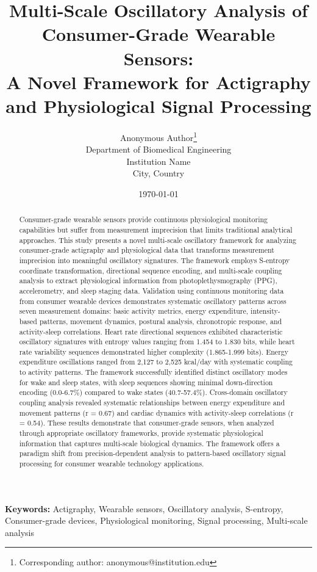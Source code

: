 \documentclass[12pt,a4paper]{article}
\title{
    \Large \textbf{Multi-Scale Oscillatory Analysis of Consumer-Grade Wearable Sensors: \\
    A Novel Framework for Actigraphy and Physiological Signal Processing}
}
\author{
    Anonymous Author\thanks{Corresponding author: anonymous@institution.edu} \\
    \small Department of Biomedical Engineering \\
    \small Institution Name \\
    \small City, Country
}
\date{\today}
\theoremstyle{definition}
\begin{document}
\maketitle

\begin{abstract}
Consumer-grade wearable sensors provide continuous physiological monitoring capabilities but suffer from measurement imprecision that limits traditional analytical approaches. This study presents a novel multi-scale oscillatory framework for analyzing consumer-grade actigraphy and physiological data that transforms measurement imprecision into meaningful oscillatory signatures. The framework employs S-entropy coordinate transformation, directional sequence encoding, and multi-scale coupling analysis to extract physiological information from photoplethysmography (PPG), accelerometry, and sleep staging data. Validation using continuous monitoring data from consumer wearable devices demonstrates systematic oscillatory patterns across seven measurement domains: basic activity metrics, energy expenditure, intensity-based patterns, movement dynamics, postural analysis, chronotropic response, and activity-sleep correlations. Heart rate directional sequences exhibited characteristic oscillatory signatures with entropy values ranging from 1.454 to 1.830 bits, while heart rate variability sequences demonstrated higher complexity (1.865-1.999 bits). Energy expenditure oscillations ranged from 2,127 to 2,525 kcal/day with systematic coupling to activity patterns. The framework successfully identified distinct oscillatory modes for wake and sleep states, with sleep sequences showing minimal down-direction encoding (0.0-6.7\%) compared to wake states (40.7-57.4\%). Cross-domain oscillatory coupling analysis revealed systematic relationships between energy expenditure and movement patterns (r = 0.67) and cardiac dynamics with activity-sleep correlations (r = 0.54). These results demonstrate that consumer-grade sensors, when analyzed through appropriate oscillatory frameworks, provide systematic physiological information that captures multi-scale biological dynamics. The framework offers a paradigm shift from precision-dependent analysis to pattern-based oscillatory signal processing for consumer wearable technology applications.
\end{abstract}

\textbf{Keywords:} Actigraphy, Wearable sensors, Oscillatory analysis, S-entropy, Consumer-grade devices, Physiological monitoring, Signal processing, Multi-scale analysis
\end{document}
